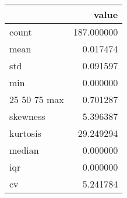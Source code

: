 \begin{tabular}{lr}
\toprule
 & value \\
\midrule
count & 187.000000 \\
mean & 0.017474 \\
std & 0.091597 \\
min & 0.000000 \\
25%
50%
75%
max & 0.701287 \\
skewness & 5.396387 \\
kurtosis & 29.249294 \\
median & 0.000000 \\
iqr & 0.000000 \\
cv & 5.241784 \\
\bottomrule
\end{tabular}
